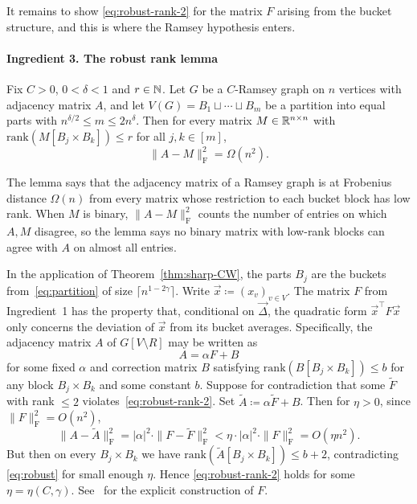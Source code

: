 It remains to show \eqref{eq:robust-rank-2} for the matrix $F$ arising from the bucket structure, and this is where the Ramsey hypothesis enters.

\paragraph{Ingredient 3. The robust rank lemma}

\begin{lemma}
\label{lem:robust-rank}
  Fix $C > 0$, $0 < \delta < 1$ and $r \in \mathbb{N}$. Let $G$ be a $C$-Ramsey graph on $n$ vertices with adjacency matrix $A$, and let $V(G) = B_1 \sqcup \cdots \sqcup B_m$ be a partition into equal parts with $n^{\delta/2} \leq m \leq 2n^{\delta}$. Then for every matrix $M \in \mathbb{R}^{n \times n}$ with $\mathrm{rank}(M[B_j \times B_k]) \leq r$ for all $j, k \in [m]$,
  \begin{equation}
    \label{eq:robust}
    \|A - M\|_{\mathrm{F}}^2 = \Omega(n^2).
  \end{equation}
\end{lemma}

The lemma says that the adjacency matrix of a Ramsey graph is at Frobenius distance $\Omega(n)$ from every matrix whose restriction to each bucket block has low rank. When $M$ is binary, $\|A - M\|_{\mathrm{F}}^2$ counts the number of entries on which $A, M$ disagree, so the lemma says no binary matrix with low-rank blocks can agree with $A$ on almost all entries.

In the application of Theorem~\ref{thm:sharp-CW}, the parts $B_j$ are the buckets from~\eqref{eq:partition} of size $\lceil n^{1-2\gamma} \rceil$. Write $\vec x \coloneqq (x_v)_{v \in V}$. The matrix $F$ from Ingredient~1 has the property that, conditional on $\vec \Delta$, the quadratic form $\vec x^{\top} F \vec x$ only concerns the deviation of $\vec x$ from its bucket averages. Specifically, the adjacency matrix $A$ of $G[V \setminus R]$ may be written as
\[
  A = \alpha F + B
\]
for some fixed $\alpha$ and correction matrix $B$ satisfying $\mathrm{rank}(B[B_j \times B_k]) \leq b$ for any block $B_j \times B_k$ and some constant $b$. Suppose for contradiction that some $\tilde{F}$ with rank $\leq 2$ violates~\eqref{eq:robust-rank-2}. Set $\tilde{A} \coloneqq \alpha \tilde{F} + B$. Then for $\eta > 0$, since $\|F\|_{\mathrm{F}}^2 = O(n^2)$,
\[
  \|A - \tilde A\|_{\mathrm{F}}^2 = |\alpha|^2 \cdot \|F - \tilde F\|_{\mathrm{F}}^2 < \eta \cdot |\alpha|^2 \cdot \|F\|_{\mathrm{F}}^2 = O(\eta n^2).
\] 
But then on every $B_j \times B_k$ we have $\mathrm{rank}(\tilde{A}[B_j \times B_k]) \leq b + 2$, contradicting \eqref{eq:robust} for small enough $\eta$. Hence \eqref{eq:robust-rank-2} holds for some $\eta = \eta(C, \gamma)$. See~\cite[Section~12]{Kwan_2023} for the explicit construction of $F$.

